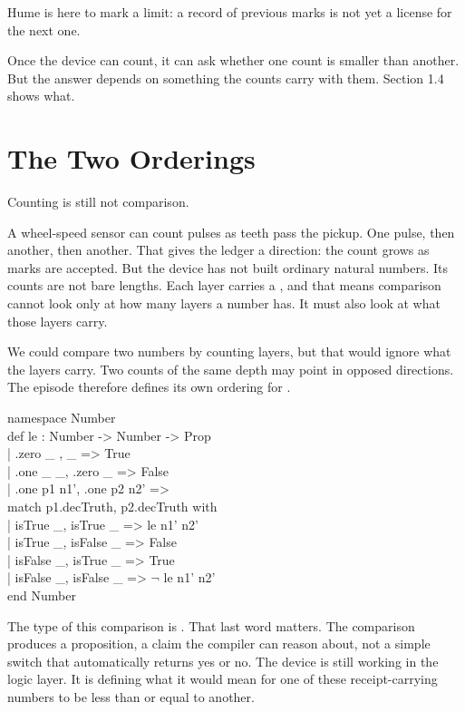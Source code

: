 Hume is here to mark a limit: a record of previous marks is not yet a license
for the next one.

Once the device can count, it can ask whether one count is smaller than
another. But the answer depends on something the counts carry with them.
Section 1.4 shows what.

\section{The Two Orderings}
\label{se:two-orderings}

Counting is still not comparison.

A wheel-speed sensor can count pulses as teeth pass the pickup. One pulse,
then another, then another. That gives the ledger a direction: the count grows
as marks are accepted. But the device has not built ordinary natural numbers.
Its counts are not bare lengths. Each layer carries a , and that
means comparison cannot look only at how many layers a number has. It must also
look at what those layers carry.

We could compare two numbers by counting layers, but that would ignore what the
layers carry. Two counts of the same depth may point in opposed directions. The
episode therefore defines its own ordering for .

\begin{leancode}
namespace Number\\
def le : Number -> Number -> Prop\\
\quad | .zero \_ , \_ => True\\
\quad | .one \_ \_, .zero \_ => False\\
\quad | .one p1 n1', .one p2 n2' =>\\
\quad\quad match p1.decTruth, p2.decTruth with\\
\quad\quad | isTrue \_,  isTrue \_  => le n1' n2'\\
\quad\quad | isTrue \_,  isFalse \_ => False\\
\quad\quad | isFalse \_, isTrue \_  => True\\
\quad\quad | isFalse \_, isFalse \_ => \(\neg\) le n1' n2'\\
end Number
\end{leancode}

The type of this comparison is . That last word
matters. The comparison produces a proposition, a claim the compiler can reason
about, not a simple  switch that automatically returns yes or no.
The device is still working in the logic layer. It is defining what it would
mean for one of these receipt-carrying numbers to be less than or equal to
another.

